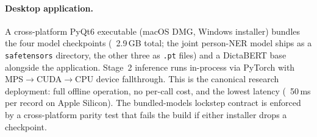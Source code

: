 \documentclass[Afour,sageh,times]{sagej}
\begin{document}
\paragraph{Desktop application.} A cross-platform PyQt6 executable (macOS DMG, Windows installer) bundles the four model checkpoints (~2.9\,GB total; the joint person-NER model ships as a \texttt{safetensors} directory, the other three as \texttt{.pt} files) and a DictaBERT base alongside the application. Stage~2 inference runs in-process via PyTorch with MPS$\rightarrow$CUDA$\rightarrow$CPU device fallthrough. This is the canonical research deployment: full offline operation, no per-call cost, and the lowest latency (~50\,ms per record on Apple Silicon). The bundled-models lockstep contract is enforced by a cross-platform parity test that fails the build if either installer drops a checkpoint.
\end{document}
